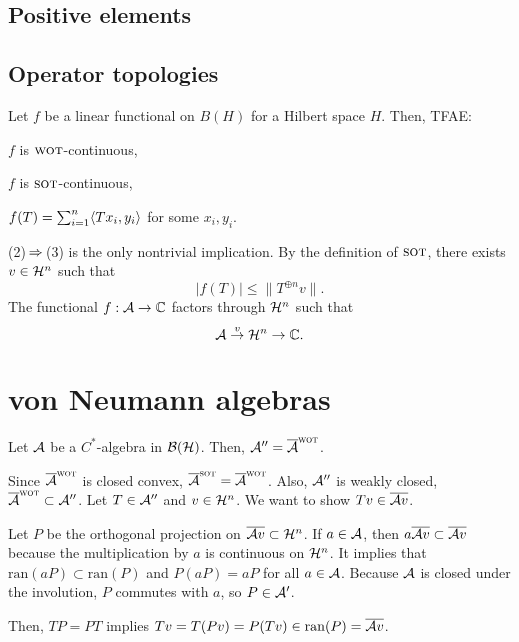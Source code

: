 \documentclass{../exp}
\newcommand{\wot}{{\text{\sc wot}}}
\newcommand{\sot}{{\text{\sc sot}}}
\newcommand{\ran}{\mathrm{ran}}
\begin{document}
\subsection{Positive elements}





\subsection{Operator topologies}

\begin{thm}
Let $f$ be a linear functional on $B(H)$ for a Hilbert space $H$.
Then, TFAE:
\begin{cond}
\item $f$ is $\wot$-continuous,
\item $f$ is $\sot$-continuous,
\item $f(T)=\sum_{i=1}^n\langle Tx_i,y_i\rangle$ for some $x_i,y_i$.
\end{cond}
\end{thm}
\begin{pf}
(2)$\impl$(3) is the only nontrivial implication.
By the definition of $\sot$, there exists $v\in \mathcal{H}^n$ such that
\[|f(T)|\le\|T^{\oplus n}v\|.\]
The functional $f:\cA\to\C$ factors through $\mathcal{H}^n$ such that
\[\cA\to{v}\cH^n\to\C.\]
\end{pf}




\section{von Neumann algebras}

\begin{thm}
Let $\mathcal{A}$ be a $C^*$-algebra in $\mathcal{B}(\mathcal{H})$.
Then, $\cA''=\cl\cA^\wot$.
\end{thm}
\begin{pf}
Since $\cl\cA^\wot$ is closed convex, $\cl\cA^\sot=\cl\cA^\wot$.
Also, $\mathcal{A}''$ is weakly closed, $\cl\cA^\wot\subset\cA''$.
Let $T\in\mathcal{A}''$ and $v\in\mathcal{H}^n$.
We want to show $Tv\in\overline{\mathcal{A} v}$.

Let $P$ be the orthogonal projection on $\overline{\mathcal{A} v}\subset\mathcal{H}^n$.
If $a\in\mathcal{A}$, then $a\overline{\mathcal{A} v}\subset\overline{\mathcal{A} v}$ because the multiplication by $a$ is continuous on $\mathcal{H}^n$.
It implies that $\ran(aP)\subset\ran(P)$ and $P(aP)=aP$ for all $a\in\mathcal{A}$.
Because $\mathcal{A}$ is closed under the involution, $P$ commutes with $a$, so $P\in\mathcal{A}'$.

Then, $TP=PT$ implies $Tv=T(Pv)=P(Tv)\in\ran(P)=\cl{\cA v}$.

\end{pf}
\end{document}
